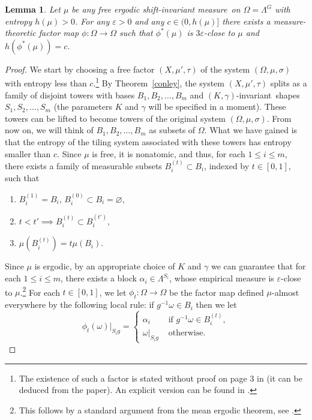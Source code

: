 \documentclass{amsart}
\newtheorem{lem}[thm]{Lemma}
\theoremstyle{remark}
\def \eps {\varepsilon}
\def \im {invariant measure}
\def \inv {invariant}
\begin{document}
\begin{lem}\label{l3}
Let $\mu$ be any free ergodic shift-\im\ on $\Omega=\Lambda^G$ with entropy $h(\mu)>0$. For any $\eps>0$ and any $c\in(0,h(\mu)]$ there exists a measure-theoretic factor map $\phi:\Omega\to\Omega$ 
such that $\phi^*(\mu)$ is $3\eps$-close to $\mu$ and
$h(\phi^*(\mu))=c$.
\end{lem}
\begin{proof}We start by choosing a free factor $(X,\mu',\tau)$ of the system $(\Omega,\mu,\sigma)$ with entropy less than $c$.\footnote{The existence of such a factor is stated without proof on page 3 in \cite{8a} (it can be deduced from the paper). An explicit version can be found in \cite[Theorem 5.4]{3a}.}
By Theorem~\ref{conley}, the system $(X,\mu',\tau)$ splits as a family of disjoint towers with bases $B_1,B_2,\dots,B_m$ and $(K,\gamma)$-\inv\ shapes $S_1,S_2,\dots,S_m$ (the parameters $K$ and $\gamma$ will be specified in a moment). These towers can be lifted to become towers of the original system $(\Omega,\mu,\sigma)$. From now on, we will think of $B_1,B_2,\dots,B_m$ as subsets of $\Omega$. What we have gained is that the  entropy of the tiling system associated with these towers has entropy smaller than $c$.
Since $\mu$ is free, it is nonatomic, and thus, for each $1\le i\le m$, there exists a family of measurable subsets $B^{(t)}_i\subset B_i$, indexed by $t\in[0,1]$, such that
\begin{enumerate}
    \item $B^{(1)}_i= B_i$, $B^{(0)}_i\subset B_i=\varnothing$, 
    \item $t<t'\implies B^{(t)}_i\subset B^{(t')}_i$,
    \item $\mu(B^{(t)}_i)=t\mu(B_i)$.
\end{enumerate}
Since $\mu$ is ergodic, by an appropriate choice of $K$ and $\gamma$ we can guarantee that for each $1\le i\le m$, there exists a block $\alpha_i\in\Lambda^{S_i}$, whose empirical measure is $\eps$-close to $\mu$.\footnote{This follows by a standard argument from the mean ergodic theorem, see \cite[Theorem~3,~p.\,52]{8a}.} For each $t\in[0,1]$, we let $\phi_t:\Omega\to\Omega$ be the factor map defined $\mu$-almost everywhere by the following local rule: if $g^{-1}\omega\in B_i$ then we let
$$
\phi_t(\omega)|_{S_ig} = 
\begin{cases}
\alpha_i& \text{ if }g^{-1}\omega\in B^{(t)}_i,\\
\omega|_{S_ig}& \text{ otherwise}.
\end{cases}
$$


\end{proof}
\end{document}
